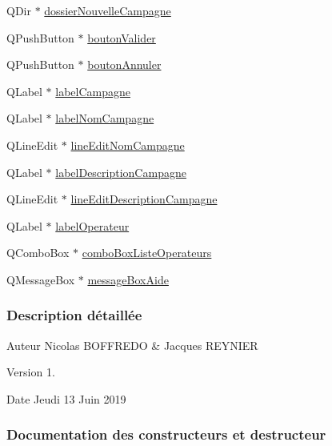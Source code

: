 \begin{DoxyCompactItemize}
\item 
Q\+Dir $\ast$ \hyperlink{class_i_h_m_rov_a95cd05040c8adc3c0513050661d532db}{dossier\+Nouvelle\+Campagne}
\item 
Q\+Push\+Button $\ast$ \hyperlink{class_i_h_m_rov_a4294b6c808089083906fb0815d1c9c27}{bouton\+Valider}
\item 
Q\+Push\+Button $\ast$ \hyperlink{class_i_h_m_rov_a4a6fec1b4a86c93c1d0d62d66804db5c}{bouton\+Annuler}
\item 
Q\+Label $\ast$ \hyperlink{class_i_h_m_rov_a3ae7bec5b8f85f779ab58ba60556b37f}{label\+Campagne}
\item 
Q\+Label $\ast$ \hyperlink{class_i_h_m_rov_a723334735d6a20ea43f79567892cfd25}{label\+Nom\+Campagne}
\item 
Q\+Line\+Edit $\ast$ \hyperlink{class_i_h_m_rov_a3b3dac7166ab414832dea0b5ad1a570d}{line\+Edit\+Nom\+Campagne}
\item 
Q\+Label $\ast$ \hyperlink{class_i_h_m_rov_addac593dfa0ea112cf4cc1b3837ca5e0}{label\+Description\+Campagne}
\item 
Q\+Line\+Edit $\ast$ \hyperlink{class_i_h_m_rov_aedf9fd0d893326f970aa1b73dbe06e85}{line\+Edit\+Description\+Campagne}
\item 
Q\+Label $\ast$ \hyperlink{class_i_h_m_rov_a1855235995ed076748b568a1702355c9}{label\+Operateur}
\item 
Q\+Combo\+Box $\ast$ \hyperlink{class_i_h_m_rov_a32ee4423982fa3a78e59167ed2354f6e}{combo\+Box\+Liste\+Operateurs}
\item 
Q\+Message\+Box $\ast$ \hyperlink{class_i_h_m_rov_a8a6bdcda8ffc99b12b7232c988f6e797}{message\+Box\+Aide}
\end{DoxyCompactItemize}


\subsubsection{Description détaillée}
\begin{DoxyAuthor}{Auteur}
Nicolas B\+O\+F\+F\+R\+E\+DO \& Jacques R\+E\+Y\+N\+I\+ER
\end{DoxyAuthor}
\begin{DoxyVersion}{Version}
1.
\end{DoxyVersion}
\begin{DoxyDate}{Date}
Jeudi 13 Juin 2019 
\end{DoxyDate}


\subsubsection{Documentation des constructeurs et destructeur}
\mbox{\label{class_i_h_m_rov_a5dac1fb4612866cc61f699a415e0ef6b}} 
